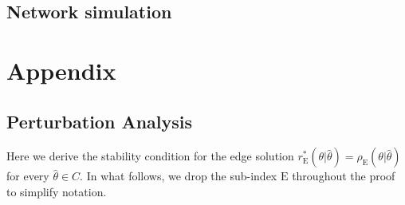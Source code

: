 \documentclass{article}
\newcommand{\rE}{r_{\text{E}}}
\newcommand{\rhoE}{\rho_{\text{E}}}
\newcommand{\thetah}{\hat{\theta}}
\begin{document}
\subsection{}


\subsection{Network simulation}


\newpage
\section{Appendix}
\subsection{Perturbation Analysis}
Here we derive the stability condition for the edge solution $\rE^*(\theta|\thetah)=\rhoE(\theta|\thetah)$ for every $\thetah\in C$. In what follows, we drop the sub-index $\mathrm{E}$ throughout the proof to simplify notation.
\end{document}

